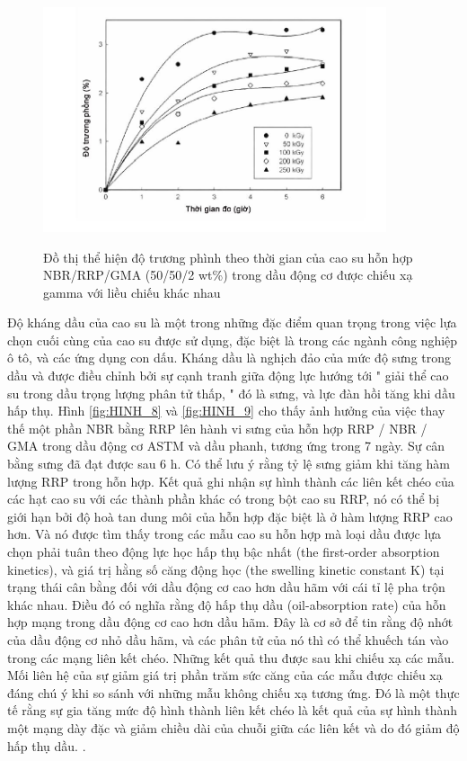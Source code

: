 \documentclass[12pt,a4paper]{article}
\begin{document}
		\begin{figure}
			\centering
			\includegraphics[width=0.9\textwidth]{12.JPG}
			\label{fig:HINH_10}
			\caption{Đồ thị thể hiện độ trương phình theo thời gian của cao su hỗn hợp NBR/RRP/GMA (50/50/2 wt\%) trong dầu động cơ được chiếu xạ gamma với liều chiếu khác nhau}
		\end{figure}
		
	Độ kháng dầu của cao su là một trong những đặc điểm quan trọng trong việc lựa chọn cuối cùng của cao su được sử dụng, đặc biệt là trong các ngành công nghiệp ô tô, và các ứng dụng con dấu. Kháng dầu là nghịch đảo của mức độ sưng trong dầu và được điều chỉnh bởi sự cạnh tranh giữa động lực hướng tới " giải thể cao su trong dầu trọng lượng phân tử thấp, " đó là sưng, và lực đàn hồi tăng khi dầu hấp thụ. 
	Hình \ref{fig:HINH_8} và \ref{fig:HINH_9} cho thấy ảnh hưởng của việc thay thế một phần NBR bằng RRP lên hành vi sưng của hỗn hợp RRP / NBR / GMA trong dầu động cơ ASTM và dầu phanh, tương ứng trong 7 ngày. Sự cân bằng sưng đã đạt được sau 6 h. Có thể lưu ý rằng tỷ lệ sưng giảm khi tăng hàm lượng RRP trong hỗn hợp. Kết quả ghi nhận sự hình thành các liên kết chéo của các hạt cao su với các thành phần khác có trong bột cao su RRP, nó có thể bị giới hạn bởi độ hoà tan dung môi của hỗn hợp đặc biệt là ở hàm lượng RRP cao hơn. Và nó được tìm thấy trong các mẫu cao su hỗn hợp mà loại dầu được lựa chọn phải tuân theo động lực học hấp thụ bậc nhất (the first-order absorption kinetics), và giá trị hằng số căng động học (the swelling kinetic constant K) tại trạng thái cân bằng đối với dầu động cơ cao hơn dầu hãm với cái tỉ lệ pha trộn khác nhau. Điều đó có nghĩa rằng độ hấp thụ dầu (oil-absorption rate) của hỗn hợp mạng trong dầu động cơ cao hơn dầu hãm. Đây là cơ sở để tin rằng độ nhớt của dầu động cơ nhỏ dầu hãm, và các phân tử của nó thì có thể khuếch tán vào trong các mạng liên kết chéo. Những kết quả thu được sau khi chiếu xạ các mẫu. Mối liên hệ của sự giảm giá trị phần trăm sức căng của các mẫu được chiếu xạ đáng chú ý khi so sánh với những mẫu không chiếu xạ tương ứng. Đó là một thực tế rằng sự gia tăng mức độ hình thành liên kết chéo là kết quả của sự hình thành một mạng dày đặc và giảm chiều dài của chuỗi giữa các liên kết và do đó giảm độ hấp thụ dầu.
.		
		
\end{document}
